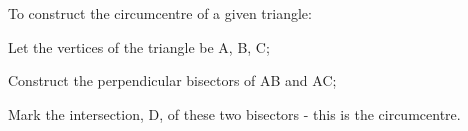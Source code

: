 To construct the circumcentre of a given triangle:
\par
Let the vertices of the triangle be A, B, C;
\par
Construct the perpendicular bisectors of AB and AC;
\par
Mark the intersection, D, of these two bisectors - this is the circumcentre.